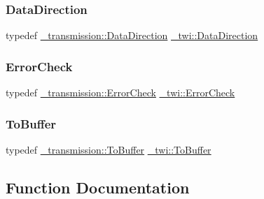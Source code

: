 \hypertarget{namespace__twi_a98f74649c4d80fc9488d6d800f594f1a}{}\label{namespace__twi_a98f74649c4d80fc9488d6d800f594f1a} 
\subsubsection{\texorpdfstring{Data\+Direction}{DataDirection}}
{\footnotesize\ttfamily typedef \hyperlink{namespace__transmission_a49a33659d7c6abcf7f0180cd7e34fa0e}{\+\_\+transmission\+::\+Data\+Direction} \hyperlink{namespace__transmission_a49a33659d7c6abcf7f0180cd7e34fa0e}{\+\_\+twi\+::\+Data\+Direction}}

\hypertarget{namespace__twi_a0352adedf1acccfb9bc17c262397da0a}{}\label{namespace__twi_a0352adedf1acccfb9bc17c262397da0a} 
\subsubsection{\texorpdfstring{Error\+Check}{ErrorCheck}}
{\footnotesize\ttfamily typedef \hyperlink{namespace__transmission_aea6508744dac6029815eb3aac4affda8}{\+\_\+transmission\+::\+Error\+Check} \hyperlink{namespace__transmission_aea6508744dac6029815eb3aac4affda8}{\+\_\+twi\+::\+Error\+Check}}

\hypertarget{namespace__twi_ad3ca29587a3e7dda67fc93c9be2a275d}{}\label{namespace__twi_ad3ca29587a3e7dda67fc93c9be2a275d} 
\subsubsection{\texorpdfstring{To\+Buffer}{ToBuffer}}
{\footnotesize\ttfamily typedef \hyperlink{namespace__transmission_a43fedd4787676a3bbd1a35dbfa138f06}{\+\_\+transmission\+::\+To\+Buffer} \hyperlink{namespace__transmission_a43fedd4787676a3bbd1a35dbfa138f06}{\+\_\+twi\+::\+To\+Buffer}}



\subsection{Function Documentation}
\hypertarget{namespace__twi_aa8cdb79f8922f74622428ff54a50b568}{}\label{namespace__twi_aa8cdb79f8922f74622428ff54a50b568} 
